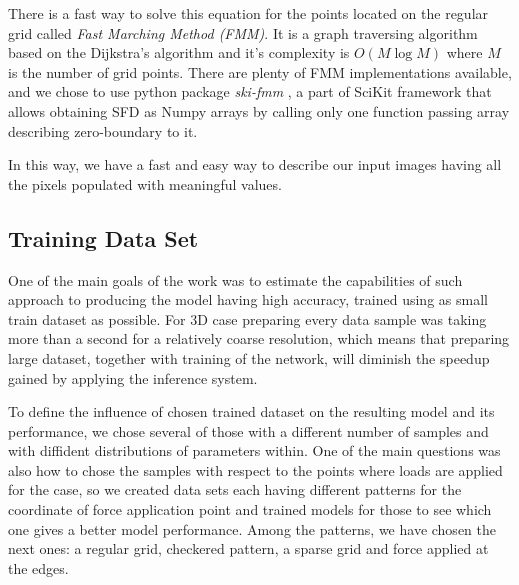 There is a fast way to solve this equation for the points located on the regular grid called \emph{Fast Marching Method (FMM)}.
It is a graph traversing algorithm based on the Dijkstra's algorithm \cite{bibl:fmm} and it's complexity is $ O(M \log M) $ where $M$ is the number of grid points.
There are plenty of FMM implementations available, and we chose to use python package \emph{ski-fmm} \cite{scikit-fmm}, a part of SciKit framework that allows obtaining SFD as Numpy arrays\cite{bibl:numpy} by calling only one function passing array describing zero-boundary to it.
\medskip

In this way, we have a fast and easy way to describe our input images having all the pixels populated with meaningful values.
\medskip

\subsection{Training Data Set}

One of the main goals of the work was to estimate the capabilities of such approach to producing the model having high accuracy, trained using as small train dataset as possible.
For 3D case preparing every data sample was taking more than a second for a relatively coarse resolution, which means that preparing large dataset, together with training of the network, will diminish the speedup gained by applying the inference system.  
\medskip

To define the influence of chosen trained dataset on the resulting model and its performance, we chose several of those with a different number of samples and with diffident distributions of parameters within. 
One of the main questions was also how to chose the samples with respect to the points where loads are applied for the case, so we created data sets each having different patterns for the coordinate of force application point and trained models for those to see which one gives a better model performance.
Among the patterns, we have chosen the next ones: a regular grid, checkered pattern, a sparse grid and force applied at the edges.

